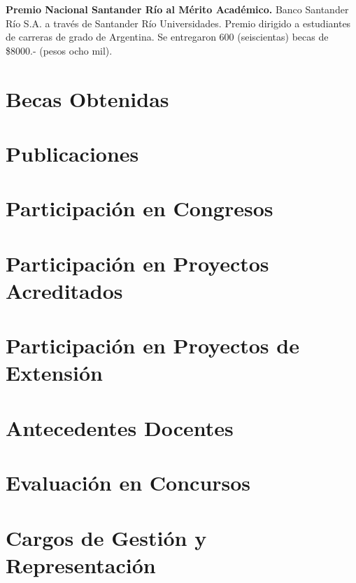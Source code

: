 \documentclass[11pt]{article}
\begin{document}
 \textbf{Premio Nacional Santander Río al Mérito Académico.} Banco Santander Río S.A. a través de Santander Río Universidades. Premio dirigido a estudiantes de carreras de grado de Argentina. Se entregaron 600 (seiscientas) becas de \$8000.- (pesos ocho mil).

\section*{Becas Obtenidas}



\section*{Publicaciones}



\section*{Participación en Congresos}



\section*{Participación en Proyectos Acreditados}



\section*{Participación en Proyectos de Extensión}



\section*{Antecedentes Docentes}



\section*{Evaluación en Concursos}



\section*{Cargos de Gestión y Representación}
\end{document}
